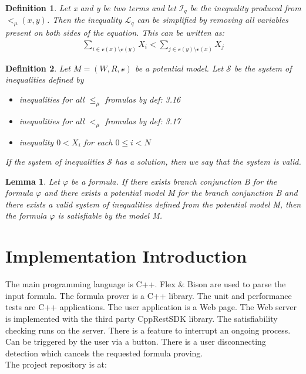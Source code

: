 \documentclass{article}
\newtheorem{defn}{Definition}[section]
\newtheorem{lemma}[theorem]{Lemma}
\newcommand{\vE}{\mathscr{v}}
\begin{document}
		\begin{defn}
			Let x and y be two terms and let $\mathscr{I}_q$ be the inequality produced from $<_\mu(x, y)$. Then the inequality $\mathscr{L}_q$ can be simplified 
			by removing all variables present on both sides of the equation. This can be written as:
			\begin{align*}
				\sum_{i \in \vE(x) \setminus \vE(y)} X_i < \sum_{j \in \vE(y) \setminus \vE(x)} X_j
			\end{align*}
		\end{defn}

		\begin{defn}
			Let $M = (W, R, \vE)$ be a potential model. Let $\mathscr{S}$ be the system of inequalities defined by
			\begin{itemize}
				\item inequalities for all $\le_\mu$ fromulas by def: 3.16 
				\item inequalities for all $<_\mu$ fromulas by def: 3.17
				\item inequality $0 < X_i$ for each $0 \le i < N$  
			\end{itemize}
			If the system of inequalities $\mathscr{S}$ has a solution, then we say that the system is valid.
		\end{defn}
		\begin{lemma}
			\label{building-lemma}
			Let $\varphi$ be a formula. If there exists branch conjunction B for the formula $\varphi$
			and there exists a potential model M for the branch conjunction B and 
			there exists a valid system of inequalities defined from the potential model M,
			then the formula $\varphi$ is satisfiable by the model M.
		\end{lemma}

	\newpage
	\section{Implementation Introduction}
	The main programming language is C++. Flex \& Bison are used to parse the input formula. The formula prover is a C++ library. The unit and performance tests are C++ applications.
	The user application is a Web page. The Web server is implemented with the third party CppRestSDK library. The satisfiability checking runs on the server. There is a feature to interrupt an ongoing process. Can be triggered by the user via a button. There is a user disconnecting detection which cancels the requested formula proving. \\
	The project repository is at:
\end{document}
